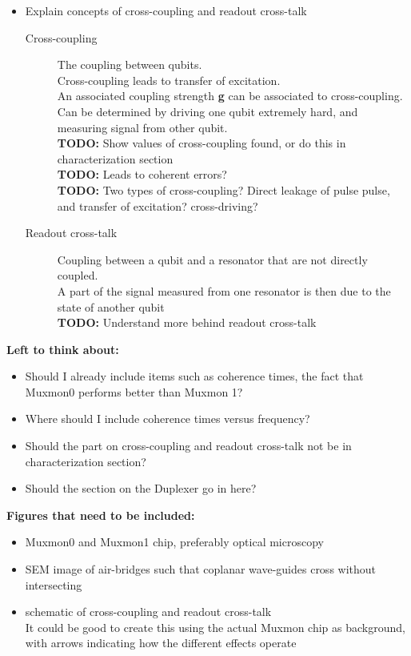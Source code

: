 \documentclass[12pt]{report}
\begin{document}
\begin{itemize}
      \item Explain concepts of cross-coupling and readout cross-talk
      \begin{description}
        \item[Cross-coupling] The coupling between qubits. \\
                    Cross-coupling leads to transfer of excitation.\\
                    An associated coupling strength \textbf{g} can be associated to cross-coupling.\\
                    Can be determined by driving one qubit extremely hard, and measuring signal from other qubit.\\
                    \textbf{TODO:} Show values of cross-coupling found, or do this in characterization section \\
                    \textbf{TODO:} Leads to coherent errors? \\
                    \textbf{TODO:} Two types of cross-coupling? Direct leakage of pulse pulse, and transfer of excitation? cross-driving?
        \item[Readout cross-talk] Coupling between a qubit and a resonator that are not directly coupled.\\
                      A part of the signal measured from one resonator is then due to the state of another qubit \\
                      \textbf{TODO:} Understand more behind readout cross-talk
      \end{description}

    \end{itemize}

    \textbf{Left to think about:}
    \begin{itemize}
      \item Should I already include items such as coherence times, the fact that Muxmon0 performs better than Muxmon 1?
      \item Where should I include coherence times versus frequency?
      \item Should the part on cross-coupling and readout cross-talk not be in characterization section?
      \item Should the section on the Duplexer go in here?
    \end{itemize}

    \textbf{Figures that need to be included:}
    \begin{itemize}
      \item Muxmon0 and Muxmon1 chip, preferably optical microscopy
      \item SEM image of air-bridges such that coplanar wave-guides cross without intersecting
      \item schematic of cross-coupling and readout cross-talk \\
          It could be good to create this using the actual Muxmon chip as background, with arrows indicating how the different effects operate
    \end{itemize}
\end{document}
